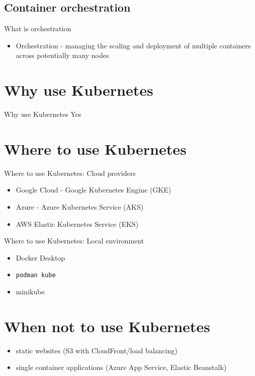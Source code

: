 \documentclass{beamer}
\begin{document}
	\subsection{Container orchestration}
	\begin{frame}{What is orchestration}
		\begin{itemize}
			\item Orchestration - managing the scaling and deployment of multiple containers across potentially many nodes
		\end{itemize}
	\end{frame}
	
	\section{Why use Kubernetes}
	\begin{frame}{Why use Kubernetes}
		Yes
	\end{frame}
	\section{Where to use Kubernetes}
	\begin{frame}{Where to use Kubernetes: Cloud providers}
		\begin{itemize}
			\item Google Cloud - Google Kubernetes Engine (GKE)
			\pause
			\item Azure - Azure Kubernetes Service (AKS)
			\pause
			\item AWS Elastic Kubernetes Service (EKS)
		\end{itemize}
	\end{frame}
	\begin{frame}{Where to use Kubernetes: Local environment}
		\begin{itemize}
			\item Docker Desktop
			\pause
			\item \texttt{podman kube}
			\pause
			\item minikube
		\end{itemize}
	\end{frame}
	\section{When not to use Kubernetes}
	\begin{frame}
		\begin{itemize}
			\item static websites (S3 with CloudFront/load balancing)
			\item single container applications (Azure App Service, Elastic Beanstalk)
		\end{itemize}
		
	\end{frame}
\end{document}
